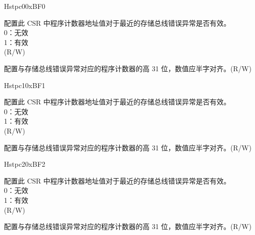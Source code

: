 \begin{register}{H}{stpc0}{0xBF0}\label{regdesc:STPC0}%
%
%
\regnewline%
\begin{regdesc}\begin{reglist}
\label{fielddesc:STPC0_VLD}\item [VLD] 配置此 CSR 中程序计数器地址值对于最近的存储总线错误异常是否有效。\\
0：无效\\
1：有效\\
(R/W)
\label{fielddesc:STPC0_ADDR}\item [ADDR] 配置与存储总线错误异常对应的程序计数器的高 31 位，数值应半字对齐。(R/W)
\end{reglist}\end{regdesc}
\end{register}

\begin{register}{H}{stpc1}{0xBF1}\label{regdesc:STPC1}%
%
%
\regnewline%
\begin{regdesc}\begin{reglist}
\label{fielddesc:STPC1_VLD}\item [VLD] 配置此 CSR 中程序计数器地址值对于最近的存储总线错误异常是否有效。\\
0：无效\\
1：有效\\
(R/W)
\label{fielddesc:STPC1_ADDR}\item [ADDR] 配置与存储总线错误异常对应的程序计数器的高 31 位，数值应半字对齐。(R/W)
\end{reglist}\end{regdesc}
\end{register}

\begin{register}{H}{stpc2}{0xBF2}\label{regdesc:STPC2}%
%
%
\regnewline%
\begin{regdesc}\begin{reglist}
\label{fielddesc:STPC2_VLD}\item [VLD] 配置此 CSR 中程序计数器地址值对于最近的存储总线错误异常是否有效。\\
0：无效\\
1：有效\\
(R/W)
\label{fielddesc:STPC2_ADDR}\item [ADDR] 配置与存储总线错误异常对应的程序计数器的高 31 位，数值应半字对齐。(R/W)
\end{reglist}\end{regdesc}
\end{register}

